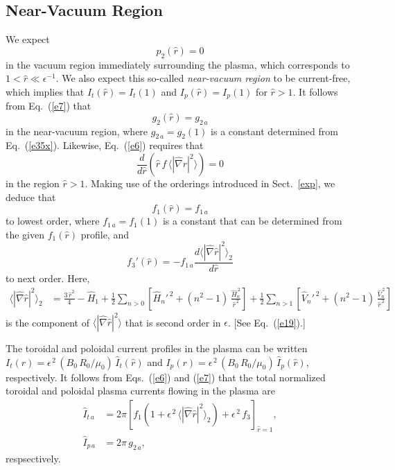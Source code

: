 \documentclass[12pt,prb,aps]{revtex4-1}
\begin{document}
\subsection{Near-Vacuum Region}
We expect 
\begin{equation}\label{e39c}
p_2(\hat{r})=0
\end{equation}
 in the vacuum region immediately surrounding the plasma, which corresponds to $1<\hat{r}\ll \epsilon^{-1}$. We
also expect this so-called {\em near-vacuum region}\/ to be current-free, which implies that $I_t(\hat{r})=I_t(1)$ and $I_p(\hat{r})=I_p(1)$ for 
$\hat{r}>1$. It follows from Eq.~(\ref{e7}) that 
\begin{equation}\label{eg2a}
g_2(\hat{r})= g_{2\,a}
\end{equation}
 in the near-vacuum region, where $g_{2\,a}=g_2(1)$ is a constant determined from Eq.~(\ref{e35x}). 
Likewise, Eq.~(\ref{e6}) requires that
\begin{equation}
\frac{d}{d\hat{r}}\!\left(\hat{r}\,f\,\langle |\hat{\nabla} r|^2\rangle\right)=0
\end{equation}
in the region $\hat{r}>1$. Making use of the orderings introduced in Sect.~\ref{exp}, we deduce that
\begin{equation}\label{e34}
f_1(\hat{r})= f_{1\,a}
\end{equation}
to lowest order, where $f_{1\,a}=f_1(1)$ is a constant that can be determined from the given $f_1(\hat{r})$ profile, and 
\begin{equation}\label{e33}
f_3'(\hat{r}) = -f_{1\,a}\frac{d\langle|\hat\nabla\hat{r}|^2\rangle_2}{d\hat{r}}
\end{equation}
to next order. Here, 
\begin{align}
\langle |\hat\nabla\hat{r}|^2\rangle_2&=
\frac{3\,\hat{r}^2}{4}-\hat{H}_1+
\frac{1}{2}\sum_{n>0}\left[\hat{H}_n'^{\,2}+(n^2-1)\,\frac{\hat{H}_n^{\,2}}{\hat{r}^{\,2}}\right]+
\frac{1}{2}\sum_{n>1}\left[\hat{V}_n'^{\,2}+(n^2-1)\,\frac{\hat{V}_n^{\,2}}{\hat{r}^{\,2}}\right]\label{e35t}
\end{align}
is the component of $\langle |\hat\nabla\hat{r}|^2\rangle$ that is second order in $\epsilon$. [See Eq.~(\ref{e19}).] 

The toroidal and poloidal current profiles in the plasma can be written $I_{t}(r)= \epsilon^{\,2}\,(B_0\,R_0/\mu_0)\,\hat{I}_t(\hat{r})$ and $I_{p}(r)=  \epsilon^{\,2}\,(B_0\,R_0/\mu_0)\,\hat{I}_p(\hat{r})$,  respectively.  It follows from Eqs.~(\ref{e6}) and (\ref{e7}) that the total
normalized toroidal and poloidal plasma currents flowing in the plasma are
\begin{align}
\hat{I}_{t\,a} &= 2\pi\left[f_1\left(1+\epsilon^{\,2}\,\langle |\hat\nabla\hat{r}|^2\rangle_2\right)+\epsilon^{\,2}\,f_3\right]_{\hat{r}=1},\\[0.5ex]
\hat{I}_{p\,a}&=2\pi\,g_{2\,a},
\end{align}
respsectively. 
\end{document}
